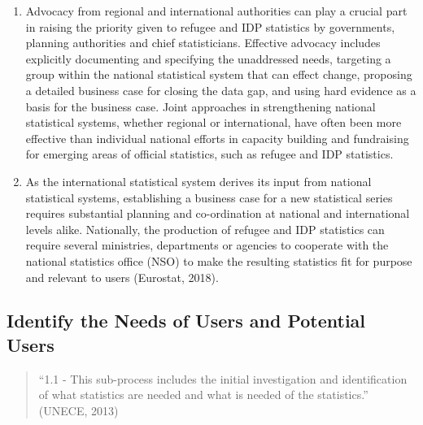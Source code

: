 \documentclass[
]{article}
\begin{document}
\begin{enumerate}
\def\labelenumi{\arabic{enumi}.}
\setcounter{enumi}{22}
\item
  Advocacy from regional and international authorities can play a
  crucial part in raising the priority given to refugee and IDP
  statistics by governments, planning authorities and chief
  statisticians. Effective advocacy includes explicitly documenting
  and specifying the unaddressed needs, targeting a group within the
  national statistical system that can effect change, proposing a
  detailed business case for closing the data gap, and using hard
  evidence as a basis for the business case. Joint approaches in
  strengthening national statistical systems, whether regional or
  international, have often been more effective than individual
  national efforts in capacity building and fundraising for emerging
  areas of official statistics, such as refugee and IDP statistics.
\item
  As the international statistical system derives its input from
  national statistical systems, establishing a business case for a new
  statistical series requires substantial planning and co-ordination
  at national and international levels alike. Nationally, the
  production of refugee and IDP statistics can require several
  ministries, departments or agencies to cooperate with the national
  statistics office (NSO) to make the resulting statistics fit for
  purpose and relevant to users (Eurostat, 2018).
\end{enumerate}

\hypertarget{identify-the-needs-of-users-and-potential-users-1}{%
\subsection{Identify the Needs of Users and Potential Users}\label{identify-the-needs-of-users-and-potential-users-1}}

\begin{quote}
``1.1 - This sub-process includes the initial investigation and
identification of what statistics are needed and what is needed of the
statistics.'' (UNECE, 2013)
\end{quote}
\end{document}
